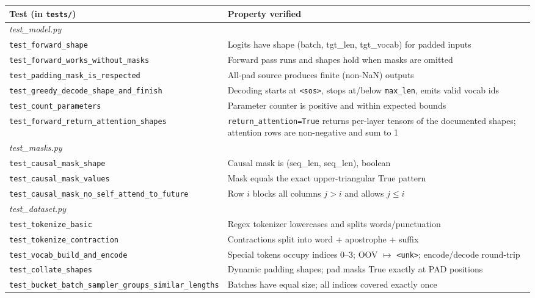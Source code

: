 \documentclass[10pt]{article}
\begin{document}
\begin{table}[htbp]
\centering
\small
\begin{tabularx}{\textwidth}{l X}
\toprule
\textbf{Test (in \texttt{tests/})} & \textbf{Property verified} \\
\midrule
\multicolumn{2}{l}{\emph{test\_model.py}} \\
\texttt{test\_forward\_shape} & Logits have shape (batch, tgt\_len, tgt\_vocab) for padded inputs \\
\texttt{test\_forward\_works\_without\_masks} & Forward pass runs and shapes hold when masks are omitted \\
\texttt{test\_padding\_mask\_is\_respected} & All-pad source produces finite (non-NaN) outputs \\
\texttt{test\_greedy\_decode\_shape\_and\_finish} & Decoding starts at \texttt{<sos>}, stops at/below \texttt{max\_len}, emits valid vocab ids \\
\texttt{test\_count\_parameters} & Parameter counter is positive and within expected bounds \\
\texttt{test\_forward\_return\_attention\_shapes} & \texttt{return\_attention=True} returns per-layer tensors of the documented shapes; attention rows are non-negative and sum to 1 \\
\midrule
\multicolumn{2}{l}{\emph{test\_masks.py}} \\
\texttt{test\_causal\_mask\_shape} & Causal mask is (seq\_len, seq\_len), boolean \\
\texttt{test\_causal\_mask\_values} & Mask equals the exact upper-triangular True pattern \\
\texttt{test\_causal\_mask\_no\_self\_attend\_to\_future} & Row $i$ blocks all columns $j > i$ and allows $j \leq i$ \\
\midrule
\multicolumn{2}{l}{\emph{test\_dataset.py}} \\
\texttt{test\_tokenize\_basic} & Regex tokenizer lowercases and splits words/punctuation \\
\texttt{test\_tokenize\_contraction} & Contractions split into word + apostrophe + suffix \\
\texttt{test\_vocab\_build\_and\_encode} & Special tokens occupy indices 0--3; OOV $\mapsto$ \texttt{<unk>}; encode/decode round-trip \\
\texttt{test\_collate\_shapes} & Dynamic padding shapes; pad masks True exactly at PAD positions \\
\texttt{test\_bucket\_batch\_sampler\_groups\_similar\_lengths} & Batches have equal size; all indices covered exactly once \\

\end{tabularx}
\end{table}
\end{document}

